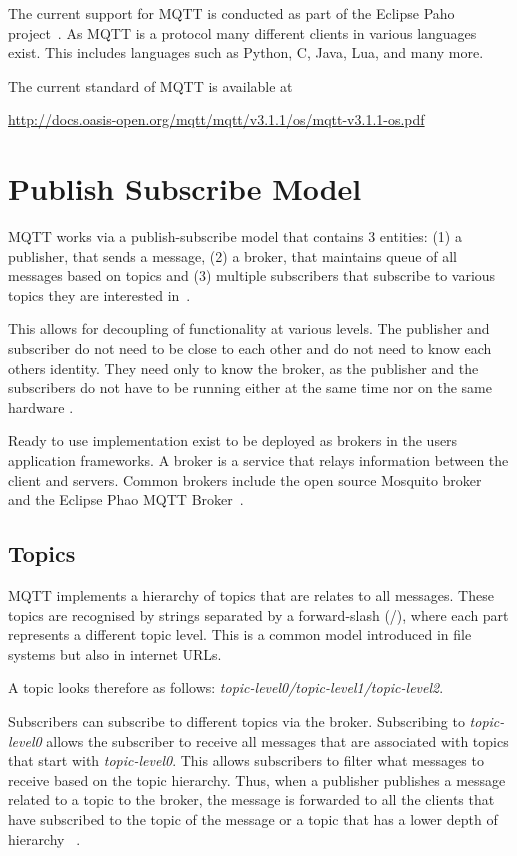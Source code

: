 The current support for MQTT is conducted as part of the Eclipse Paho
project~\cite{eclipse-mosquitto}.  As MQTT is a protocol many
different clients in various languages exist.  This includes languages
such as Python, C, Java, Lua, and many more.

The current standard of MQTT is available at 

\url{http://docs.oasis-open.org/mqtt/mqtt/v3.1.1/os/mqtt-v3.1.1-os.pdf}

\section{Publish Subscribe Model}

MQTT works via a publish-subscribe model that contains 3 entities: (1) a
publisher, that sends a message, (2) a broker, that maintains queue of all
messages based on topics and (3) multiple subscribers that subscribe to
various topics they are interested in~\cite{how-mqtt-works}.

This allows for decoupling of functionality at various levels. The
publisher and subscriber do not need to be close to each other and do
not need to know each others identity. They need only to know the
broker, as the publisher and the subscribers do not have to be running
either at the same time nor on the same hardware
\cite{hivemq-details}.

Ready to use implementation exist to be deployed as brokers in the
users application frameworks. A broker is a service that relays
information between the client and servers. Common brokers include the
open source Mosquito broker~\cite{mqtt-official} and the Eclipse Phao
MQTT Broker~\cite{eclipse-mosquitto}.


\subsection{Topics}

MQTT implements a hierarchy of topics that are relates
to all messages. These topics are recognised by strings separated by a
forward-slash (/), where each part represents a different topic
level. This is a common model introduced in file systems but also in
internet URLs. 

A topic looks therefore as follows: \textit{topic-level0/topic-level1/topic-level2}.



Subscribers can subscribe to different topics via the broker.
Subscribing to \textit{topic-level0} allows the subscriber to receive all
messages that are associated with topics that start with {\em
  topic-level0}. This allows subscribers to filter what messages to
receive based on the topic hierarchy. Thus, when a publisher publishes
a message related to a topic to the broker, the message is forwarded
to all the clients that have subscribed to the topic of the message or
a topic that has a lower depth of hierarchy~\cite{hivemq-details}
\cite{how-mqtt-works}.

